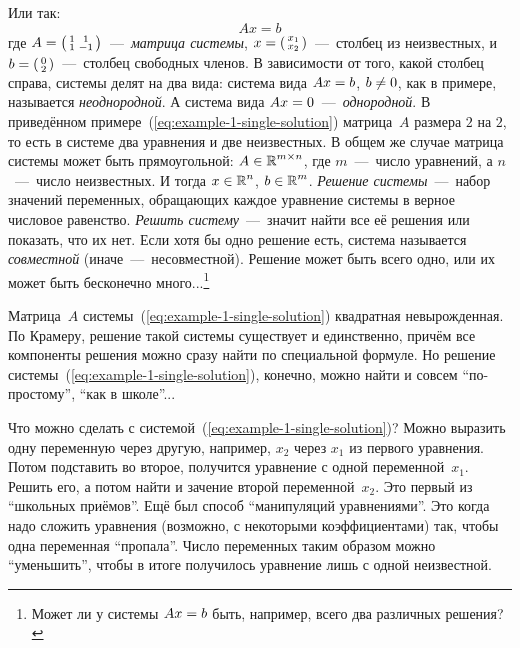 \documentclass[a4paper,12pt]{article}
\begin{document}
  Или так:
  \[
    Ax = b
  \]
  где $A \hm= \left(\begin{smallmatrix}1 & 1\\1 & -1\end{smallmatrix}\right)$~---~\emph{матрица системы}, $x \hm= \left(\begin{smallmatrix}x_1 \\ x_2\end{smallmatrix}\right)$~---~столбец из неизвестных, и $b \hm= \left(\begin{smallmatrix}0 \\ 2\end{smallmatrix}\right)$~---~столбец свободных членов.
  В зависимости от того, какой столбец справа, системы делят на два вида: система вида $Ax \hm= b$, $b \hm{\not=} 0$, как в примере, называется \emph{неоднородной}.
  А система вида $Ax \hm= 0$~---~\emph{однородной}.
  В приведённом примере~(\ref{eq:example-1-single-solution}) матрица~$A$ размера $2$ на $2$, то есть в системе два уравнения и две неизвестных.
  В общем же случае матрица системы может быть прямоугольной: $A \hm\in \RR^{m\times n}$, где $m$~---~число уравнений, а $n$~---~число неизвестных.
  И тогда $x \hm\in \RR^n$, $b \hm\in \RR^m$.
  \emph{Решение системы}~---~набор значений переменных, обращающих каждое уравнение системы в верное числовое равенство.
  \emph{Решить систему}~---~значит найти все её решения или показать, что их нет.
  Если хотя бы одно решение есть, система называется \emph{совместной} (иначе~---~несовместной).
  Решение может быть всего одно, или их может быть бесконечно много...\footnote{Может ли у системы $Ax \hm= b$ быть, например, всего два различных решения?}

  Матрица~$A$ системы~(\ref{eq:example-1-single-solution}) квадратная невырожденная.
  По Крамеру, решение такой системы существует и единственно, причём все компоненты решения можно сразу найти по специальной формуле.
  Но решение системы~(\ref{eq:example-1-single-solution}), конечно, можно найти и совсем ``по-простому'', ``как в школе''...
  
  Что можно сделать с системой~(\ref{eq:example-1-single-solution})?
  Можно выразить одну переменную через другую, например, $x_2$ через $x_1$ из первого уравнения.
  Потом подставить во второе, получится уравнение с одной переменной~$x_1$.
  Решить его, а потом найти и зачение второй переменной~$x_2$.
  Это первый из ``школьных приёмов''.
  Ещё был способ ``манипуляций уравнениями''.
  Это когда надо сложить уравнения (возможно, с некоторыми коэффициентами) так, чтобы одна переменная ``пропала''.
  Число переменных таким образом можно ``уменьшить'', чтобы в итоге получилось уравнение лишь с одной неизвестной.
\end{document}
